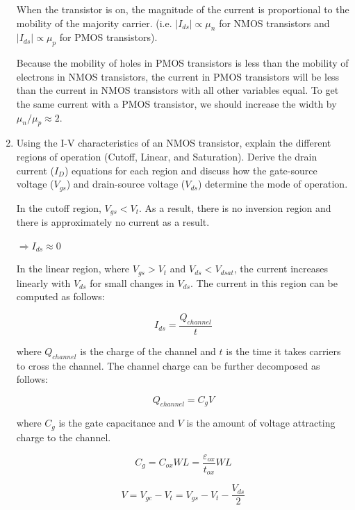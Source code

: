 \documentclass[fleqn]{article}
\begin{document}
\begin{enumerate}
		When the transistor is on, the magnitude of the current is proportional to the mobility of the majority carrier. (i.e. $|I_{ds}| \propto \mu_n$ for NMOS transistors and $|I_{ds}| \propto \mu_p$ for PMOS transistors).
		
		Because the mobility of holes in PMOS transistors is less than the mobility of electrons in NMOS transistors, the current in PMOS transistors will be less than the current in NMOS transistors with all other variables equal. To get the same current with a PMOS transistor, we should increase the width by $\mu_n/\mu_p \approx 2$.
		
		\item Using the I-V characteristics of an NMOS transistor, explain the different regions of operation (Cutoff, Linear, and Saturation). Derive the drain current ($I_D$) equations for each region and discuss how the gate-source voltage ($V_{gs}$) and drain-source voltage ($V_{ds}$) determine the mode of operation. 

		In the cutoff region, $V_{gs} < V_t$. As a result, there is no inversion region and there is approximately no current as a result.
		
		$\Rightarrow I_{ds} \approx 0$
		
		In the linear region, where $V_{gs} > V_t$ and $V_{ds} < V_{dsat}$, the current increases linearly with $V_{ds}$ for small changes in $V_{ds}$. The current in this region can be computed as follows:
		
		\begin{equation*}		
			I_{ds} = \frac{Q_{channel}}{t}
		\end{equation*}
		
		where $Q_{channel}$ is the charge of the channel and $t$ is the time it takes carriers to cross the channel. The channel charge can be further decomposed as follows:
		
		\begin{equation*}
			Q_{channel} = C_gV
		\end{equation*}
		
		where $C_g$ is the gate capacitance and $V$ is the amount of voltage attracting charge to the channel.
		
		\begin{equation*}
			C_g = C_{ox}WL = \frac{\varepsilon_{ox}}{t_{ox}}WL
		\end{equation*}
		
		\begin{equation*}
			V = V_{gc} - V_t = V_{gs} - V_t - \frac{V_{ds}}{2}
		\end{equation*}
		

\end{enumerate}
\end{document}

